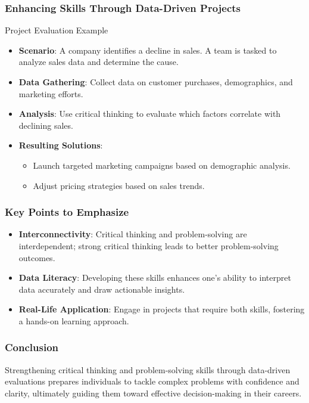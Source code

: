 \documentclass[aspectratio=169]{beamer}
\begin{document}
\begin{frame}[fragile]
    \frametitle{Enhancing Skills Through Data-Driven Projects}
    \begin{block}{Project Evaluation Example}
        \begin{itemize}
            \item \textbf{Scenario}: A company identifies a decline in sales. A team is tasked to analyze sales data and determine the cause.
            \item \textbf{Data Gathering}: Collect data on customer purchases, demographics, and marketing efforts.
            \item \textbf{Analysis}: Use critical thinking to evaluate which factors correlate with declining sales.
            \item \textbf{Resulting Solutions}: 
            \begin{itemize}
                \item Launch targeted marketing campaigns based on demographic analysis.
                \item Adjust pricing strategies based on sales trends.
            \end{itemize}
        \end{itemize}
    \end{block}
\end{frame}

\begin{frame}[fragile]
    \frametitle{Key Points to Emphasize}
    \begin{itemize}
        \item \textbf{Interconnectivity}: Critical thinking and problem-solving are interdependent; strong critical thinking leads to better problem-solving outcomes.
        \item \textbf{Data Literacy}: Developing these skills enhances one's ability to interpret data accurately and draw actionable insights.
        \item \textbf{Real-Life Application}: Engage in projects that require both skills, fostering a hands-on learning approach.
    \end{itemize}
\end{frame}

\begin{frame}[fragile]
    \frametitle{Conclusion}
    Strengthening critical thinking and problem-solving skills through data-driven evaluations prepares individuals to tackle complex problems with confidence and clarity, ultimately guiding them toward effective decision-making in their careers.
\end{frame}
\end{document}
